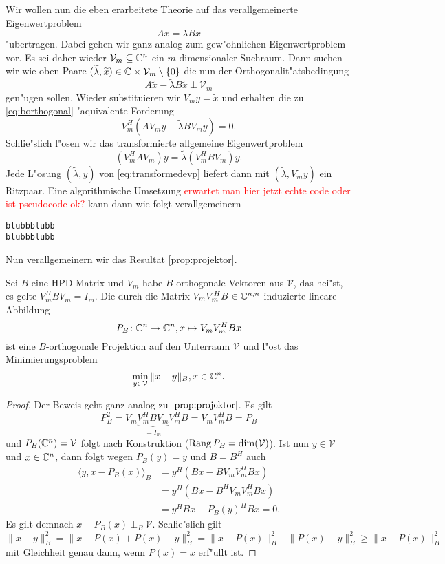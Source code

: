 Wir wollen nun die eben erarbeitete Theorie auf das verallgemeinerte Eigenwertproblem
\[
Ax = \lambda Bx
\]
"ubertragen. Dabei gehen wir ganz analog zum gew"ohnlichen Eigenwertproblem vor.
Es sei daher wieder $\mathcal{V}_m\subseteq \mathbb{C}^n$ ein $m$-dimensionaler Suchraum.
Dann suchen wir wie oben Paare $ (\widetilde{\lambda}, \widetilde{x}) \in \mathbb{C}
\times \mathcal{V}_m \setminus\{ 0\}$ die nun der Orthogonalit"atsbedingung
\begin{equation}\label{eq:borthogonal}
A\widetilde{x} - \widetilde{\lambda}B\widetilde{x} \ \bot \ \mathcal{V}_m
\end{equation}
gen"ugen sollen. Wieder substituieren wir $V_m y=\widetilde{x}$ und erhalten die
zu \eqref{eq:borthogonal} "aquivalente Forderung
\[
V_m^H(AV_m y - \widetilde{\lambda} BV_m y) = 0.
\]
Schlie"slich l"osen wir das transformierte allgemeine Eigenwertproblem
\begin{equation}\label{eq:transformedevp}
(V_m^H AV_m) y = \widetilde{\lambda} (V_m^H B V_m) y.
\end{equation}
Jede L"osung $(\widetilde{\lambda}, y)$ von \eqref{eq:transformedevp} liefert
dann mit $(\widetilde{\lambda}, V_m y)$ ein Ritzpaar. Eine algorithmische Umsetzung
\textcolor{red}{erwartet man hier jetzt echte code oder ist pseudocode ok?}
kann dann wie folgt verallgemeinern

\begin{lstlisting}[caption = Verallgemeinertes Rayleigh-Ritz-Verfahren (Vgl. ~\cite{ptep} Algorithmus A\text{,} S. 356 \textcolor{red}{wie richtig angeben?}), captionpos=b]
blubbblubb
blubbblubb
\end{lstlisting}

Nun verallgemeinern wir das Resultat \ref{prop:projektor}.

\begin{prop}
Sei $B$ eine HPD-Matrix und $V_m$ habe $B$-orthogonale Vektoren aus $\mathcal{V}$,
das hei"st, es gelte $V_m^H B V_m = I_m$.
Die durch die Matrix $V_m V_m^H B \in \mathbb{C}^{n,n}$ induzierte lineare Abbildung
\[
P_B \colon \mathbb{C}^n \to \mathbb{C}^n, x\mapsto V_m V_m^H Bx
\]
ist eine $B$-orthogonale Projektion auf den Unterraum $\mathcal{V}$ und l"ost das Minimierungsproblem
\[
\min_{y\in\mathcal{V}} \|x - y\|_B, x\in\mathbb{C}^n.
\]
\end{prop}

\begin{proof}
Der Beweis geht ganz analog zu $\ref{prop:projektor}$. Es gilt
\[
P_B^2 = V_m \underbrace{V_m^H B V_m}_{=I_m} V_m^H B = V_m V_m^H B = P_B
\]
und $P_B(\mathbb{C}^n) = \mathcal{V}$ folgt nach Konstruktion ($\operatorname{Rang}{P_B} = \dim(\mathcal{V})$). Ist nun $y\in\mathcal{V}$
und $x\in\mathbb{C}^n$, dann folgt wegen $P_B (y) = y$ und $B=B^H$ auch
\begin{align*}
\langle y, x-P_B(x)\rangle_B &= y^H (Bx - B V_m V_m^H Bx) \\
&= y^H (Bx - B^H V_m V_m^H Bx) \\
&= y^H Bx - P_B(y)^H Bx = 0.
\end{align*}
Es gilt demnach $x-P_B(x) \ \bot_B \ \mathcal{V}$. Schlie"slich gilt
\[
\|x-y\|_B^2 = \|x-P(x) + P(x)-y\|_B^2 = \|x-P(x)\|_B^2 + \|P(x)-y\|_B^2
\ge \|x-P(x)\|_B^2
\]
mit Gleichheit genau dann, wenn $P(x)=x$ erf"ullt ist.
\end{proof}


